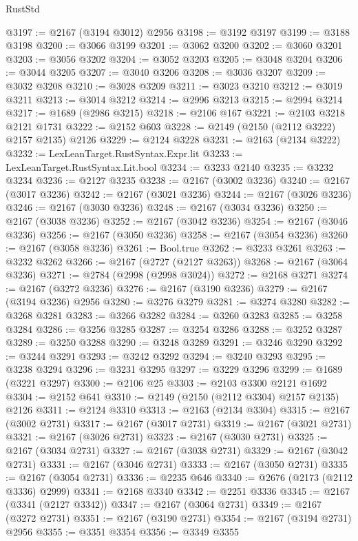 \begin{lexlean}{RustStd}
\begin{coremodule}
@3197 := @2167 (@3194 @3012) @2956
@3198 := @3192 @3197
@3199 := @3188 @3198
@3200 := @3066 @3199
@3201 := @3062 @3200
@3202 := @3060 @3201
@3203 := @3056 @3202
@3204 := @3052 @3203
@3205 := @3048 @3204
@3206 := @3044 @3205
@3207 := @3040 @3206
@3208 := @3036 @3207
@3209 := @3032 @3208
@3210 := @3028 @3209
@3211 := @3023 @3210
@3212 := @3019 @3211
@3213 := @3014 @3212
@3214 := @2996 @3213
@3215 := @2994 @3214
@3217 := @1689 (@2986 @3215)
@3218 := @2106 @167
@3221 := @2103 @3218 @2121 @1731
@3222 := @2152 @603
@3228 := @2149 (@2150 (@2112 @3222) @2157 @2135) @2126
@3229 := @2124 @3228
@3231 := @2163 (@2134 @3222)
@3232 := LexLeanTarget.RustSyntax.Expr.lit
@3233 := LexLeanTarget.RustSyntax.Lit.bool
@3234 := @3233 @2140
@3235 := @3232 @3234
@3236 := @2127 @3235
@3238 := @2167 (@3002 @3236)
@3240 := @2167 (@3017 @3236)
@3242 := @2167 (@3021 @3236)
@3244 := @2167 (@3026 @3236)
@3246 := @2167 (@3030 @3236)
@3248 := @2167 (@3034 @3236)
@3250 := @2167 (@3038 @3236)
@3252 := @2167 (@3042 @3236)
@3254 := @2167 (@3046 @3236)
@3256 := @2167 (@3050 @3236)
@3258 := @2167 (@3054 @3236)
@3260 := @2167 (@3058 @3236)
@3261 := Bool.true
@3262 := @3233 @3261
@3263 := @3232 @3262
@3266 := @2167 (@2727 (@2127 @3263))
@3268 := @2167 (@3064 @3236)
@3271 := @2784 (@2998 (@2998 @3024))
@3272 := @2168 @3271
@3274 := @2167 (@3272 @3236)
@3276 := @2167 (@3190 @3236)
@3279 := @2167 (@3194 @3236) @2956
@3280 := @3276 @3279
@3281 := @3274 @3280
@3282 := @3268 @3281
@3283 := @3266 @3282
@3284 := @3260 @3283
@3285 := @3258 @3284
@3286 := @3256 @3285
@3287 := @3254 @3286
@3288 := @3252 @3287
@3289 := @3250 @3288
@3290 := @3248 @3289
@3291 := @3246 @3290
@3292 := @3244 @3291
@3293 := @3242 @3292
@3294 := @3240 @3293
@3295 := @3238 @3294
@3296 := @3231 @3295
@3297 := @3229 @3296
@3299 := @1689 (@3221 @3297)
@3300 := @2106 @25
@3303 := @2103 @3300 @2121 @1692
@3304 := @2152 @641
@3310 := @2149 (@2150 (@2112 @3304) @2157 @2135) @2126
@3311 := @2124 @3310
@3313 := @2163 (@2134 @3304)
@3315 := @2167 (@3002 @2731)
@3317 := @2167 (@3017 @2731)
@3319 := @2167 (@3021 @2731)
@3321 := @2167 (@3026 @2731)
@3323 := @2167 (@3030 @2731)
@3325 := @2167 (@3034 @2731)
@3327 := @2167 (@3038 @2731)
@3329 := @2167 (@3042 @2731)
@3331 := @2167 (@3046 @2731)
@3333 := @2167 (@3050 @2731)
@3335 := @2167 (@3054 @2731)
@3336 := @2235 @646
@3340 := @2676 (@2173 (@2112 @3336) @2999)
@3341 := @2168 @3340
@3342 := @2251 @3336
@3345 := @2167 (@3341 (@2127 @3342))
@3347 := @2167 (@3064 @2731)
@3349 := @2167 (@3272 @2731)
@3351 := @2167 (@3190 @2731)
@3354 := @2167 (@3194 @2731) @2956
@3355 := @3351 @3354
@3356 := @3349 @3355

\end{coremodule}
\end{lexlean}
